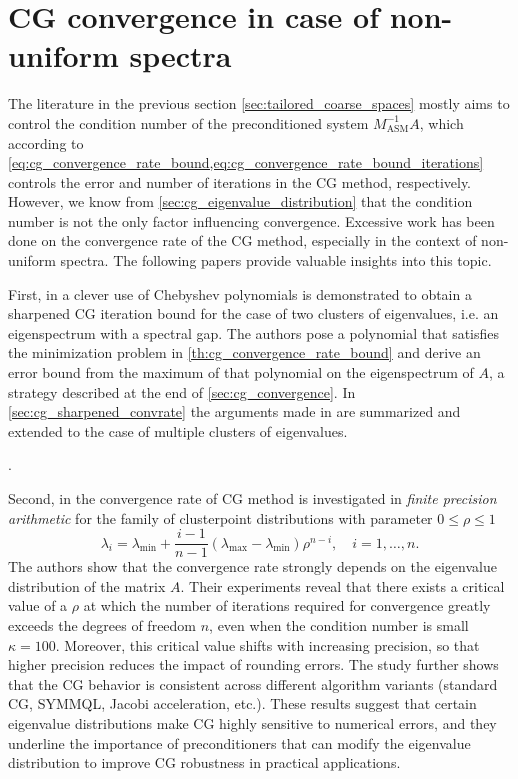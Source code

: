 \section{CG convergence in case of non-uniform spectra}\label{sec:cg_nonuniform_spectra}
The literature in the previous section \cref{sec:tailored_coarse_spaces} mostly aims to control the condition number of the preconditioned system $M_{\text{ASM}}^{-1}A$, which according to \cref{eq:cg_convergence_rate_bound,eq:cg_convergence_rate_bound_iterations} controls the error and number of iterations in the CG method, respectively. However, we know from \cref{sec:cg_eigenvalue_distribution} that the condition number is not the only factor influencing convergence. Excessive work has been done on the convergence rate of the CG method, especially in the context of non-uniform spectra. The following papers provide valuable insights into this topic.


First, in \cite{cg_sharpened_convrate_Axelsson1976} a clever use of Chebyshev polynomials is demonstrated to obtain a sharpened CG iteration bound for the case of two clusters of eigenvalues, i.e. an eigenspectrum with a spectral gap. The authors pose a polynomial that satisfies the minimization problem in \cref{th:cg_convergence_rate_bound} and derive an error bound from the maximum of that polynomial on the eigenspectrum of $A$, a strategy described at the end of \cref{sec:cg_convergence}. In \cref{sec:cg_sharpened_convrate} the arguments made in \cite{cg_sharpened_convrate_Axelsson1976} are summarized and extended to the case of multiple clusters of eigenvalues. 

.

Second, in \cite{cg_convrate_Strakos1991} the convergence rate of CG method is investigated in \textit{finite precision arithmetic} for the family of clusterpoint distributions with parameter $0 \leq \rho \leq 1$
\[
    \lambda_i = \lambda_{\text{min}} + \frac{i-1}{n-1}(\lambda_{\text{max}} - \lambda_{\text{min}})\rho^{n-i}, \quad i=1,\ldots,n.
\]
The authors show that the convergence rate strongly depends on the eigenvalue distribution of the matrix $A$. Their experiments reveal that there exists a critical value of a $\rho$ at which the number of iterations required for convergence greatly exceeds the degrees of freedom $n$, even when the condition number is small $\kappa=100$. Moreover, this critical value shifts with increasing precision, so that higher precision reduces the impact of rounding errors. The study further shows that the CG behavior is consistent across different algorithm variants (standard CG, SYMMQL, Jacobi acceleration, etc.). These results suggest that certain eigenvalue distributions make CG highly sensitive to numerical errors, and they underline the importance of preconditioners that can modify the eigenvalue distribution to improve CG robustness in practical applications.

